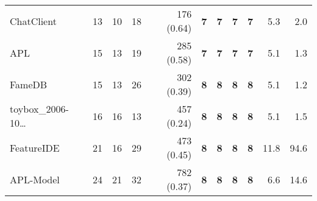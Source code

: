\begin{table*}
\begin{tiny}
{\begin{tabular}{lrrrrrrrrrr}
ChatClient & \num[text-series-to-math=true]{13} & \num[text-series-to-math=true]{10} & \num[text-series-to-math=true]{18} & \num[text-series-to-math=true]{176} (\num[text-series-to-math=true]{0.64}) & \textbf{\num[text-series-to-math=true]{7}} & \textbf{\num[text-series-to-math=true]{7}} & \textbf{\num[text-series-to-math=true]{7}} & \textbf{\num[text-series-to-math=true]{7}} & 5.3 & 2.0\\
APL & \num[text-series-to-math=true]{15} & \num[text-series-to-math=true]{13} & \num[text-series-to-math=true]{19} & \num[text-series-to-math=true]{285} (\num[text-series-to-math=true]{0.58}) & \textbf{\num[text-series-to-math=true]{7}} & \textbf{\num[text-series-to-math=true]{7}} & \textbf{\num[text-series-to-math=true]{7}} & \textbf{\num[text-series-to-math=true]{7}} & 5.1 & 1.3\\
FameDB & \num[text-series-to-math=true]{15} & \num[text-series-to-math=true]{13} & \num[text-series-to-math=true]{26} & \num[text-series-to-math=true]{302} (\num[text-series-to-math=true]{0.39}) & \textbf{\num[text-series-to-math=true]{8}} & \textbf{\num[text-series-to-math=true]{8}} & \textbf{\num[text-series-to-math=true]{8}} & \textbf{\num[text-series-to-math=true]{8}} & 5.1 & 1.2\\
toybox\_2006-10\ldots & \num[text-series-to-math=true]{16} & \num[text-series-to-math=true]{16} & \num[text-series-to-math=true]{13} & \num[text-series-to-math=true]{457} (\num[text-series-to-math=true]{0.24}) & \textbf{\num[text-series-to-math=true]{8}} & \textbf{\num[text-series-to-math=true]{8}} & \textbf{\num[text-series-to-math=true]{8}} & \textbf{\num[text-series-to-math=true]{8}} & 5.1 & 1.5\\
FeatureIDE & \num[text-series-to-math=true]{21} & \num[text-series-to-math=true]{16} & \num[text-series-to-math=true]{29} & \num[text-series-to-math=true]{473} (\num[text-series-to-math=true]{0.45}) & \textbf{\num[text-series-to-math=true]{8}} & \textbf{\num[text-series-to-math=true]{8}} & \textbf{\num[text-series-to-math=true]{8}} & \textbf{\num[text-series-to-math=true]{8}} & 11.8 & 94.6\\
APL-Model & \num[text-series-to-math=true]{24} & \num[text-series-to-math=true]{21} & \num[text-series-to-math=true]{32} & \num[text-series-to-math=true]{782} (\num[text-series-to-math=true]{0.37}) & \textbf{\num[text-series-to-math=true]{8}} & \textbf{\num[text-series-to-math=true]{8}} & \textbf{\num[text-series-to-math=true]{8}} & \textbf{\num[text-series-to-math=true]{8}} & 6.6 & 14.6\\

\end{tabular}}
\end{tiny}
\end{table*}
